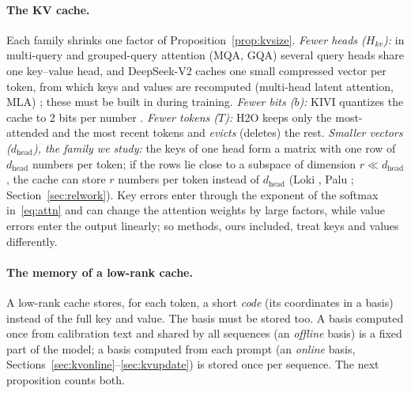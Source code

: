 \documentclass[10pt]{article}
\theoremstyle{plain}
\theoremstyle{definition}
\theoremstyle{remark}
\newcommand{\dhead}{d_{\mathrm{head}}}
\begin{document}
\paragraph{The KV cache.}
Each family shrinks one factor of Proposition~\ref{prop:kvsize}.
\emph{Fewer heads ($H_{kv}$):} in multi-query and grouped-query attention (MQA, GQA) \cite{shazeer2019,ainslie2023} several query heads share one key--value head, and DeepSeek-V2 caches one small compressed vector per token, from which keys and values are recomputed (multi-head latent attention, MLA) \cite{deepseek2024}; these must be built in during training.
\emph{Fewer bits ($b$):} KIVI quantizes the cache to 2 bits per number \cite{liu2024kivi}.
\emph{Fewer tokens ($T$):} H2O \cite{zhang2023h2o} keeps only the most-attended and the most recent tokens and \emph{evicts} (deletes) the rest.
\emph{Smaller vectors ($\dhead$), the family we study:} the keys of one head form a matrix with one row of $\dhead$ numbers per token; if the rows lie close to a subspace of dimension $r\ll\dhead$, the cache can store $r$ numbers per token instead of $\dhead$ (Loki \cite{singhania2024loki}, Palu \cite{palu2025}; Section~\ref{sec:relwork}).
Key errors enter through the exponent of the softmax in~\eqref{eq:attn} and can change the attention weights by large factors, while value errors enter the output linearly; so methods, ours included, treat keys and values differently.

\paragraph{The memory of a low-rank cache.}
A low-rank cache stores, for each token, a short \emph{code} (its coordinates in a basis) instead of the full key and value. The basis must be stored too. A basis computed once from calibration text and shared by all sequences (an \emph{offline} basis) is a fixed part of the model; a basis computed from each prompt (an \emph{online} basis, Sections~\ref{sec:kvonline}--\ref{sec:kvupdate}) is stored once per sequence. The next proposition counts both.
\end{document}
